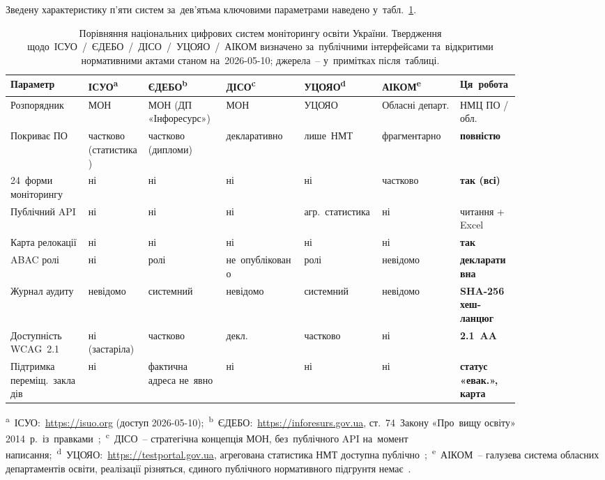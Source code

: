 Зведену характеристику п'яти систем за~дев'ятьма ключовими параметрами наведено у~табл.~\ref{tab:landscape_p1}.

\begin{table}[htbp]
\centering
\caption{Порівняння національних цифрових систем моніторингу освіти України. Твердження щодо~ІСУО~/~ЄДЕБО~/~ДІСО~/~УЦОЯО~/~АІКОМ визначено за~публічними інтерфейсами та~відкритими нормативними актами станом на~2026-05-10; джерела~-- у~примітках після~таблиці.}
\label{tab:landscape_p1}
\scriptsize
\setlength\tabcolsep{3pt}
\renewcommand{\arraystretch}{1.05}
\begin{tabular}{|p{0.13\linewidth}|p{0.10\linewidth}|p{0.13\linewidth}|p{0.13\linewidth}|p{0.13\linewidth}|p{0.13\linewidth}|p{0.10\linewidth}|}
\hline
\textbf{Параметр} & \textbf{ІСУО}\textsuperscript{a} & \textbf{ЄДЕБО}\textsuperscript{b} & \textbf{ДІСО}\textsuperscript{c} & \textbf{УЦОЯО}\textsuperscript{d} & \textbf{АІКОМ}\textsuperscript{e} & \textbf{Ця~робота} \\
\hline
Розпорядник & МОН & МОН (ДП «Інфоресурс») & МОН & УЦОЯО & Обласні департ. & НМЦ ПО / обл. \\
\hline
Покриває ПО & частково (статистика) & частково (дипломи) & декларативно & лише~НМТ & фрагментарно & \textbf{повністю} \\
\hline
24~форми моніторингу & ні & ні & ні & ні & частково & \textbf{так (всі)} \\
\hline
Публічний API & ні & ні & ні & агр.\ статистика & ні & читання + Excel \\
\hline
Карта релокації & ні & ні & ні & ні & ні & \textbf{так} \\
\hline
ABAC ролі & ні & ролі & не~опубліковано & ролі & невідомо & \textbf{декларативна} \\
\hline
Журнал аудиту & невідомо & системний & невідомо & системний & невідомо & \textbf{SHA-256 хеш-ланцюг} \\
\hline
Доступність WCAG~2.1 & ні (застаріла) & частково & декл. & частково & ні & \textbf{2.1~AA} \\
\hline
Підтримка переміщ.\ закладів & ні & фактична адреса не~явно & ні & ні & ні & \textbf{статус «евак.», карта} \\
\hline
\end{tabular}

\smallskip
{\scriptsize
\noindent\textsuperscript{a}~ІСУО:~\url{https://isuo.org} (доступ 2026-05-10);~\textsuperscript{b}~ЄДЕБО:~\url{https://inforesurs.gov.ua}, ст.~74~Закону «Про~вищу освіту» 2014~р.\ із~правками~\cite{Khozhylo2024PublicMgmt};~\textsuperscript{c}~ДІСО~-- стратегічна концепція МОН, без~публічного API на~момент написання;~\textsuperscript{d}~УЦОЯО:~\url{https://testportal.gov.ua}, агрегована статистика НМТ доступна публічно~\cite{Shatalovych2025NMT};~\textsuperscript{e}~АІКОМ~-- галузева система обласних департаментів освіти, реалізації різняться, єдиного публічного нормативного підгрунтя немає~\cite{NMTsPTO2025}.}
\end{table}

